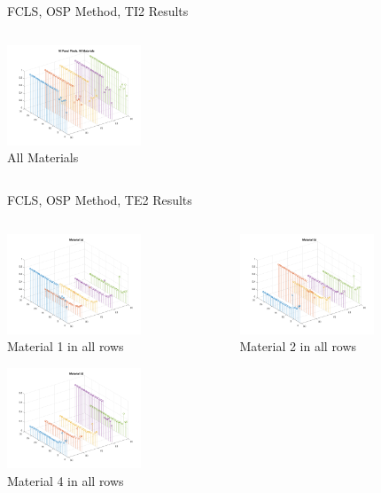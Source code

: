 \documentclass{beamer}
\begin{document}
\begin{frame}{FCLS, OSP Method, TI2 Results}
\begin{columns}
\begin{column}{0.33\textwidth}
        \includegraphics[width=4cm,center]{osp_fcls_ti2_allmaterials}
        \\ All Materials
        \centering
    \end{column}
\end{columns}
\end{frame}

\begin{frame}{FCLS, OSP Method, TE2 Results}
\begin{columns}
    \begin{column}{0.33\textwidth}
        \includegraphics[width=4cm,center]{osp_fcls_te2_material_stem_1}
        \\ Material 1 in all rows
        \centering

        \includegraphics[width=4cm,center]{osp_fcls_te2_material_stem_4}
        \\ Material 4 in all rows
        \centering
    \end{column}
    \begin{column}{0.33\textwidth}
        \includegraphics[width=4cm,center]{osp_fcls_te2_material_stem_2}
        \\ Material 2 in all rows
        \centering


\end{column}
\end{columns}
\end{frame}
\end{document}
